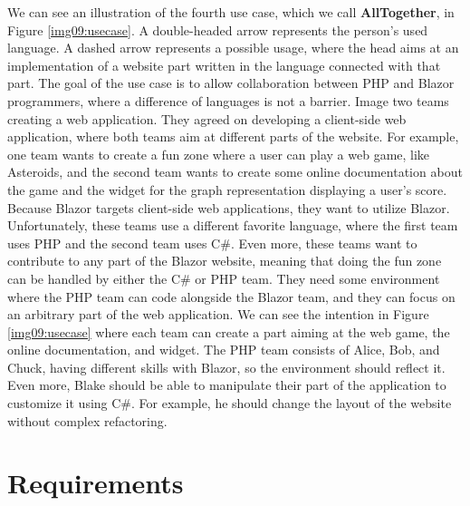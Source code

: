 \par
We can see an illustration of the fourth use case, which we call \textbf{AllTogether}, in Figure \ref{img09:usecase}.
A double-headed arrow represents the person's used language. 
A dashed arrow represents a possible usage, where the head aims at an implementation of a website part written in the language connected with that part.
The goal of the use case is to allow collaboration between PHP and Blazor programmers, where a difference of languages is not a barrier.  
Image two teams creating a web application. 
They agreed on developing a client-side web application, where both teams aim at different parts of the website.
For example, one team wants to create a fun zone where a user can play a web game, like Asteroids, and the second team wants to create some online documentation about the game and the widget for the graph representation displaying a user's score.
Because Blazor targets client-side web applications, they want to utilize Blazor.
Unfortunately, these teams use a different favorite language, where the first team uses PHP and the second team uses C\#.
Even more, these teams want to contribute to any part of the Blazor website, meaning that doing the fun zone can be handled by either the C\# or PHP team.
They need some environment where the PHP team can code alongside the Blazor team, and they can focus on an arbitrary part of the web application.
We can see the intention in Figure \ref{img09:usecase} where each team can create a part aiming at the web game, the online documentation, and widget.
The PHP team consists of Alice, Bob, and Chuck, having different skills with Blazor, so the environment should reflect it.
Even more, Blake should be able to manipulate their part of the application to customize it using C\#. For example, he should change the layout of the website without complex refactoring. 

\section{Requirements}

